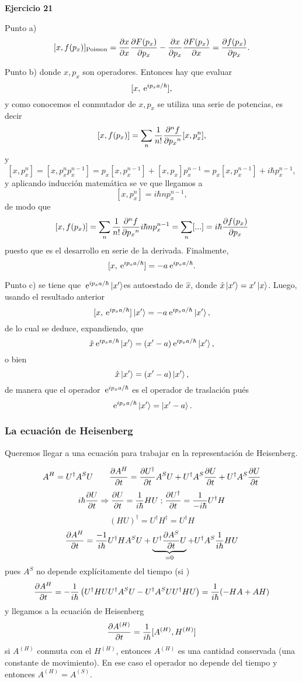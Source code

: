 \documentclass[10pt,oneside]{CBFT_book}
\begin{document}
\begin{ejemplo}{\bf Ejercicio 21}

Punto a)
\[
	[x,f(p_x)]_{\text{Poisson}} = \dpar{x}{x} \dpar{F(p_x)}{p_x} - \dpar{x}{p_x} \dpar{F(p_x)}{x}
	= \dpar{f(p_x)}{p_x}.
\]

Punto b) donde $x, p_x$ son operadores. Entonces hay que evaluar
\[
	[x,\euler^{i p_x a / \hbar} ] ,
\]
y como conocemos el conmutador de $x, p_x$ se utiliza una serie de potencias, es decir
\[
	[x,f(p_x)] = \sum_n \frac{1}{n!} \dpar[n]{f}{p_x}[x,p_x^n],
\]
y
\[
	[x,p_x^n] = [x,p_x^n p_x^{n-1}] = p_x [x,p_x^{n-1}] + [x,p_x] p_x^{n-1} =
	p_x [x,p_x^{n-1}] + i \hbar p_x^{n-1},
\]
y aplicando inducción matemática se ve que llegamos a
\[
	[x,p_x^n] = i \hbar n p_x^{n-1},
\]
de modo que
\[
	[x,f(p_x)] = \sum_n \frac{1}{n!} \dpar[n]{f}{p_x} i \hbar n p_x^{n-1} =
	\sum_n [...] = i \hbar \dpar{f(p_x)}{p_x}
\]
puesto que es el desarrollo en serie de la derivada. Finalmente,
\[
	[ x, \euler^{i p_x a / \hbar} ] = - a \euler^{ i p_x a / \hbar }.
\]

Punto c) se tiene que $\euler^{ i p_x a /\hbar} \Ket{x'} $es autoestado de $\hat{x}$, donde
$ \hat{x} \Ket{x'} = x' \Ket{x}$. Luego, usando el resultado anterior
\[
	[ x, \euler^{i p_x a / \hbar} ] \Ket{x'} = - a \euler^{ i p_x a / \hbar } \Ket{x'},
\]
de lo cual se deduce, expandiendo, que
\[
	\hat{x} \euler^{i p_x a / \hbar} \Ket{x'} = (x'-a) \euler^{i p_x a / \hbar} \Ket{x'},
\]
o bien
\[
	\hat{x} \Ket{x'} = (x'-a) \Ket{x'},
\]
de manera que el operador $\euler^{i p_x a / \hbar}$ es el operador de traslación pués
\[
	\euler^{i p_x a / \hbar} \Ket{x'} = \Ket{ x'- a }.
\]
 
\end{ejemplo}


\subsubsection{La ecuación de Heisenberg}

Queremos llegar a una ecuación para trabajar en la representación de Heisenberg.

\[
	A^H = U^\dagger A^S U \qquad \dpar{A^H}{t} = \dpar{U^\dagger}{t}A^S U + U^\dagger A^S \dpar{U}{t} +
	U^\dagger A^S \dpar{U}{t}
\]
\[
	i\hbar \dpar{U}{t} \Rightarrow  \dpar{U}{t} = \frac{1}{i\hbar}HU \; \text{;} \;
	\dpar{U^\dagger}{t} = \frac{1}{-i\hbar}U^\dagger H
\]
\[
	(HU)^\dagger = U^\dagger H^\dagger = U^\dagger H 
\]
\[
	\dpar{A^H}{t} = \frac{-1}{i\hbar} U^\dagger H A^S U + \underbrace{U^\dagger\dpar{A^S}{t} U}_{=0} +
	U^\dagger A^S \frac{1}{i\hbar} H U
\]
pues $A^S$ no depende explícitamente del tiempo (si )
\[
	\dpar{A^H}{t} = -\frac{1}{i\hbar} \left( U^\dagger HUU^\dagger A^SU -U^\dagger A^S U U^\dagger 
	HU \right) =	\frac{1}{i\hbar}(-HA + AH)
\]
y llegamos a la ecuación de Heisenberg
\[
	\dpar{A^{(H)}}{t} = \frac{1}{i\hbar} [ A^{(H)}, H^{(H)}]
\]
si $A^{(H)}$ conmuta con el $H^{(H)}$, entonces $A^{(H)}$ es una cantidad conservada 
(una constante de movimiento).
En ese caso el operador no depende del tiempo y entonces $A^{(H)} = A^{(S)}$.
\end{document}
